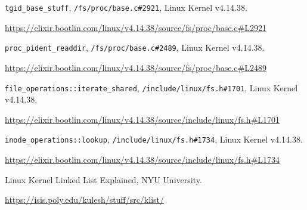 \documentclass[a4paper,10pt]{article}
\begin{document}
 \begin{thebibliography}{9}

   \lstinline{tgid_base_stuff}, \lstinline{/fs/proc/base.c#2921}, Linux Kernel v4.14.38.

   \url{https://elixir.bootlin.com/linux/v4.14.38/source/fs/proc/base.c#L2921}

   \lstinline{proc_pident_readdir}, \lstinline{/fs/proc/base.c#2489}, Linux Kernel v4.14.38.

   \url{https://elixir.bootlin.com/linux/v4.14.38/source/fs/proc/base.c#L2489}

   \lstinline{file_operations::iterate_shared}, \lstinline{/include/linux/fs.h#1701}, Linux Kernel v4.14.38.

   \url{https://elixir.bootlin.com/linux/v4.14.38/source/include/linux/fs.h#L1701}

   \lstinline{inode_operations::lookup}, \lstinline{/include/linux/fs.h#1734}, Linux Kernel v4.14.38.

   \url{https://elixir.bootlin.com/linux/v4.14.38/source/include/linux/fs.h#L1734}

   Linux Kernel Linked List Explained, NYU University.

   \url{https://isis.poly.edu/kulesh/stuff/src/klist/}

 \end{thebibliography}
\end{document}
